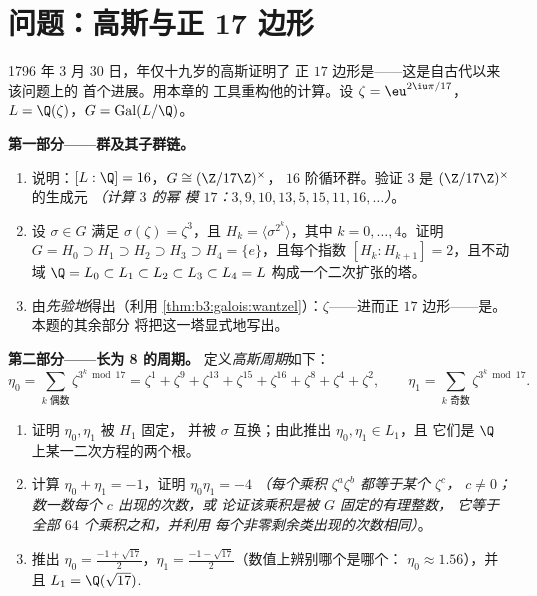 \section{问题：高斯与正 17 边形}

\begin{problem}\label{pb:b3:galois:1}
1796 年 3 月 30 日，年仅十九岁的高斯证明了
正 $17$ 边形是——这是自古代以来该问题上的
首个进展。用本章的
工具重构他的计算。设 $\zeta = \eu^{2\iu\pi/17}$，$L =
\Q(\zeta)$，$G = \operatorname{Gal}(L/\Q)$。

\medskip
\noindent\textbf{第一部分——群及其子群链。}
\begin{enumerate}
  \item 说明：$[L:\Q] = 16$，$G \cong (\Z/17\Z)^\times$，
        $16$ 阶循环群。验证 $3$ 是
        $(\Z/17\Z)^\times$ 的生成元 \emph{（计算 $3$ 的幂
        模 $17$：$3, 9, 10, 13, 5, 15, 11, 16, \dots$）}。
  \item 设 $\sigma \in G$ 满足 $\sigma(\zeta) = \zeta^3$，且
        $H_k = \langle \sigma^{2^k}\rangle$，其中 $k = 0, \dots,
        4$。证明 $G = H_0 \supset H_1 \supset H_2 \supset
        H_3 \supset H_4 = \{e\}$，且每个指数 $[H_k :
        H_{k+1}] = 2$，且不动域 $\Q = L_0
        \subset L_1 \subset L_2 \subset L_3 \subset L_4 = L$
        构成一个二次扩张的塔。
  \item 由\emph{先验地}得出（利用
        \cref{thm:b3:galois:wantzel}）：$\zeta$——进而正
        $17$ 边形——是。本题的其余部分
        将把这一塔显式地写出。
\end{enumerate}

\medskip
\noindent\textbf{第二部分——长为 8 的周期。}
定义\emph{高斯周期}如下：
\[
\eta_0 = \sum_{k \text{ 偶数}} \zeta^{3^k \bmod 17}
= \zeta^{1} + \zeta^{9} + \zeta^{13} + \zeta^{15} + \zeta^{16} +
\zeta^{8} + \zeta^{4} + \zeta^{2},
\qquad
\eta_1 = \sum_{k \text{ 奇数}} \zeta^{3^k \bmod 17}.
\]
\begin{enumerate}[resume]
  \item 证明 $\eta_0, \eta_1$ 被 $H_1$ 固定，
        并被 $\sigma$ 互换；由此推出 $\eta_0, \eta_1 \in L_1$，且
        它们是 $\Q$ 上某一二次方程的两个根。
  \item 计算 $\eta_0 + \eta_1 = -1$，证明 $\eta_0\eta_1 = -4$
        \emph{（每个乘积 $\zeta^a\zeta^b$ 都等于某个 $\zeta^c$，
        $c \neq 0$；数一数每个 $c$ 出现的次数，或
        论证该乘积是被 $G$ 固定的有理整数，
        它等于全部 $64$ 个乘积之和，并利用
        每个非零剩余类出现的次数相同）}。
  \item 推出 $\eta_0 = \frac{-1 + \sqrt{17}}2$，$\eta_1 =
        \frac{-1-\sqrt{17}}2$（数值上辨别哪个是哪个：
        $\eta_0 \approx 1.56$），并且 $L_1 =
        \Q(\sqrt{17})$.
\end{enumerate}


\end{problem}
